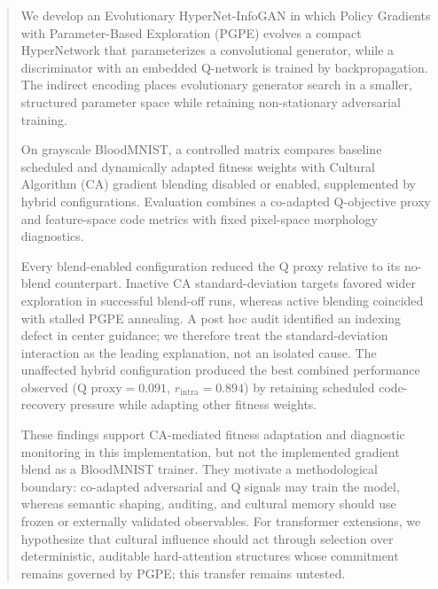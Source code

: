 
\begin{abstract}
We develop an Evolutionary HyperNet-InfoGAN in which Policy Gradients with Parameter-Based Exploration (PGPE) evolves a compact HyperNetwork that parameterizes a convolutional generator, while a discriminator with an embedded Q-network is trained by backpropagation. The indirect encoding places evolutionary generator search in a smaller, structured parameter space while retaining non-stationary adversarial training.

On grayscale BloodMNIST, a controlled matrix compares baseline scheduled and dynamically adapted fitness weights with Cultural Algorithm (CA) gradient blending disabled or enabled, supplemented by hybrid configurations. Evaluation combines a co-adapted Q-objective proxy and feature-space code metrics with fixed pixel-space morphology diagnostics.

Every blend-enabled configuration reduced the Q proxy relative to its no-blend counterpart. Inactive CA standard-deviation targets favored wider exploration in successful blend-off runs, whereas active blending coincided with stalled PGPE annealing. A post hoc audit identified an indexing defect in center guidance; we therefore treat the standard-deviation interaction as the leading explanation, not an isolated cause. The unaffected hybrid configuration produced the best combined performance observed ($\text{Q proxy}=0.091$, $r_{\text{intra}}=0.894$) by retaining scheduled code-recovery pressure while adapting other fitness weights.

These findings support CA-mediated fitness adaptation and diagnostic monitoring in this implementation, but not the implemented gradient blend as a BloodMNIST trainer. They motivate a methodological boundary: co-adapted adversarial and Q signals may train the model, whereas semantic shaping, auditing, and cultural memory should use frozen or externally validated observables. For transformer extensions, we hypothesize that cultural influence should act through selection over deterministic, auditable hard-attention structures whose commitment remains governed by PGPE; this transfer remains untested.
\end{abstract}

